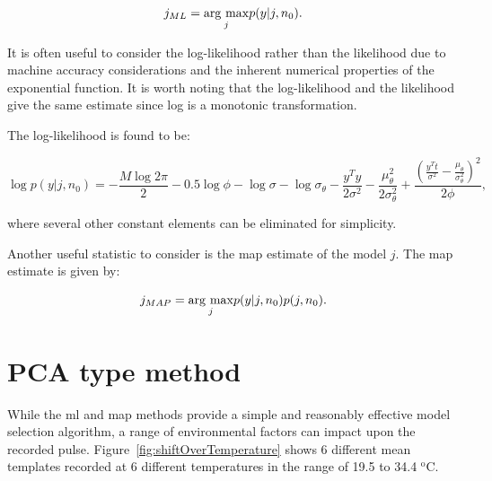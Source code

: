 \begin{equation}\label{eq:MLdefinition}
j_{ML} = \underset{j}{\mathrm{arg~max}} p(y|j,n_0).
\end{equation}

It is often useful to consider the log-likelihood rather than the likelihood due to machine accuracy considerations and the inherent numerical properties of the exponential function. It is worth noting that the log-likelihood and the likelihood give the same estimate since log is a monotonic transformation.

The log-likelihood is found to be:

\begin{equation}\label{eq:MLloglikelihood}
\log{p(y|j,n_0)} = -\frac{M\log{2\pi}}{2} - 0.5\log{\phi} - \log{\sigma} -\log{\sigma_\theta} - \frac{y^T y}{2\sigma^2} -\frac{\mu^2_\theta}{2\sigma^2_\theta} + \frac{\left(\frac{y^T t}{\sigma^2}-\frac{\mu_\theta}{\sigma^2_\theta}\right)^2}{2\phi},
\end{equation}

where several other constant elements can be eliminated for simplicity.

Another useful statistic to consider is the \gls{map} estimate of the model $j$. The \gls{map} estimate is given by:

\begin{equation}\label{eq:MAPdefinition}
j_{MAP} = \underset{j}{\mathrm{arg~max}} p(y|j,n_0)p(j,n_0).
\end{equation}


\section{PCA type method}\label{sec:APRpca}
While the \gls{ml} and \gls{map} methods provide a simple and reasonably effective model selection algorithm, a range of environmental factors can impact upon the recorded pulse. Figure~\ref{fig:shiftOverTemperature} shows 6 different mean templates recorded at 6 different temperatures in the range of 19.5 to 34.4 $^\textrm{o}$C.

